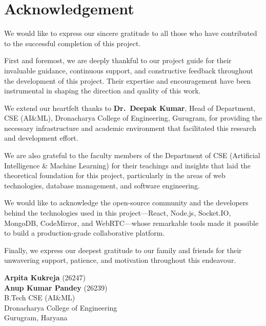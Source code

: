 \chapter*{Acknowledgement}

We would like to express our sincere gratitude to all those who have contributed to the successful completion of this project.

First and foremost, we are deeply thankful to our project guide for their invaluable guidance, continuous support, and constructive feedback throughout the development of this project. Their expertise and encouragement have been instrumental in shaping the direction and quality of this work.

We extend our heartfelt thanks to \textbf{Dr.~Deepak Kumar}, Head of Department, CSE (AI\&ML), Dronacharya College of Engineering, Gurugram, for providing the necessary infrastructure and academic environment that facilitated this research and development effort.

We are also grateful to the faculty members of the Department of CSE (Artificial Intelligence \& Machine Learning) for their teachings and insights that laid the theoretical foundation for this project, particularly in the areas of web technologies, database management, and software engineering.

We would like to acknowledge the open-source community and the developers behind the technologies used in this project---React, Node.js, Socket.IO, MongoDB, CodeMirror, and WebRTC---whose remarkable tools made it possible to build a production-grade collaborative platform.

Finally, we express our deepest gratitude to our family and friends for their unwavering support, patience, and motivation throughout this endeavour.

\vspace{2cm}

\begin{flushright}
\textbf{Arpita Kukreja} (26247)\\
\textbf{Anup Kumar Pandey} (26239)\\
B.Tech CSE (AI\&ML)\\
Dronacharya College of Engineering\\
Gurugram, Haryana
\end{flushright}

\clearpage

